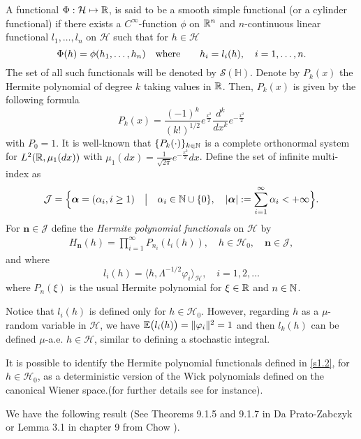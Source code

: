 \documentclass[review, onefignum, onetabnum]{siamart171218}
\begin{document}
    A functional $\Phi:\mathcal{H}\mapsto {\mathbb R}$, is said to be a smooth simple 
functional (or a cylinder functional) if there exists a 
$C^\infty$-function $\phi$ on ${\mathbb R}^n$ and $n$-continuous linear functional 
$l_1,\ldots,l_n$ on $\mathcal{H}$ such that for
$h\in\mathcal{H}$
\begin{equation}
    \Phi(h)=\phi(h_1,\ldots,h_n)\quad
    \mbox{\rm where}\qquad h_i=l_i(h),\quad i=1,\ldots,n.\label{S1.2}
\end{equation}
The set of all such functionals will be denoted by $\mathcal{S}(\mathbb{H})$.
%
Denote by $P_k(x)$ the Hermite polynomial of degree $k$ taking values in 
${\mathbb R}$. Then, $P_k(x)$ is given by the following formula
\[
     P_k(x)=\frac{(-1)^k}{(k!)^{1/2}} e^{\tfrac{x^2}{2}} 
     \frac{d^k}{dx^k}e^{-\tfrac{x^2}{2}}
\]
with $P_0=1$. It is well-known that $\{P_k(\cdot)\}_{k\in{\mathbb N}}$ is a complete 
orthonormal system for $L^2({\mathbb R},\mu_1(dx))$ with
$
    \mu_1(dx) = 
        \tfrac{1}{\sqrt{2\pi}}
        e^{-\tfrac{x^2}{2}} dx
$.
Define the set of infinite multi-index as
\[
    \mathcal{J}=\Big\{\bm{\alpha}=(\alpha_i,i\ge 1)\quad \big|\quad\alpha_i\in 
    {\mathbb N}\cup\{0\},\quad |\bm{\alpha}|:=\sum_{i=1}^\infty
    \alpha_i<+\infty  \Big\}.
\]
For $\bm{n}\in\mathcal{J} $ define the {\it Hermite polynomial functionals} 
on $\mathcal{H}$ by 
\begin{align}
    \label{s1.2}
    H_{\bm{n}}(h) = \prod_{i=1}^\infty P_{n_i}(l_i(h)),\quad 
    h \in \mathcal{H}_0, \quad \bm{n} \in \mathcal{J},
\end{align}
and where 
\[
    l_i(h) = \langle h,  \Lambda^{-1/2} \varphi_i \rangle_\mathcal{H}, \quad 
    i=1,2,\ldots
\]
where $P_n(\xi)$ is the usual Hermite polynomial for  $\xi\in{\mathbb R}$ and 
$n\in{\mathbb N}$.  
%
\begin{remark}
    Notice that $l_i(h)$ is defined only for $h \in\mathcal{H}_0$. However, 
    regarding $h$ as a $\mu$-random variable in
    $\mathcal{H}$, we have $\mathbb{E}\big(l_i (h)\big) = \|\varphi_i \|^2  = 1$ and 
    then $l_k (h)$ can be defined $\mu$-a.e. $h \in\mathcal{H}$,
    similar to defining a stochastic integral.
    
    It is possible to identify the Hermite polynomial functionals
    defined in \eqref{s1.2}, for $h \in\mathcal{H}_0$, as a deterministic 
    version of the Wick polynomials defined on the canonical Wiener space.(for 
    further details see \cite{im} for instance).
\end{remark}

    We have the following result (See Theorems 9.1.5 and 9.1.7 in Da 
Prato-Zabczyk \cite{da-za} or Lemma 3.1 in chapter 9 from Chow \cite{liu}).
\end{document}
